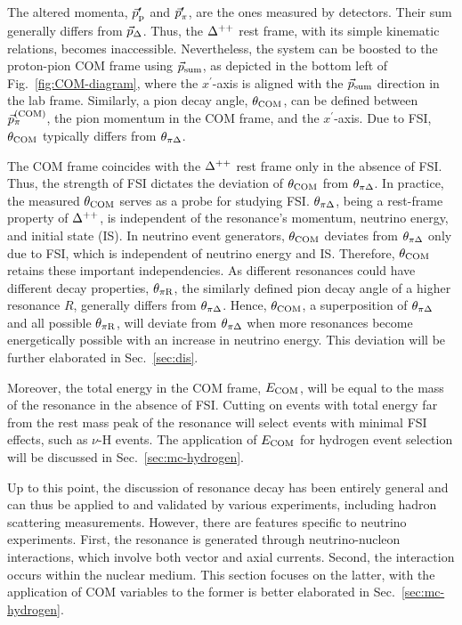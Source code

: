 The altered momenta, $\vec{p}_\textrm{p}^{\prime}$ and $\vec{p}_{\pi}^{\prime}$, are the ones measured by detectors. 
Their sum generally differs from $\vec{p}_{\Delta}$.
Thus, the $\Delta^{++}$ rest frame, with its simple kinematic relations, becomes inaccessible.
Nevertheless, the system can be boosted to the proton-pion COM frame using $\vec{p}_{\textrm{sum}}$, as depicted in the bottom left of Fig.~\ref{fig:COM-diagram}, where the $x^{\prime}$-axis is aligned with the $\vec{p}_{\textrm{sum}}$ direction in the lab frame.
Similarly, a pion decay angle, $\theta_{\textrm{COM}}$, can be defined between $\vec{p}_{\pi}^{(\textrm{COM})}$, the pion momentum in the COM frame, and the $x^{\prime}$-axis.
Due to FSI, $\theta_{\textrm{COM}}$ typically differs from $\theta_{\pi\Delta}$. 

The COM frame coincides with the $\Delta^{++}$ rest frame only in the absence of FSI.
Thus, the strength of FSI dictates the deviation of $\theta_{\textrm{COM}}$ from $\theta_{\pi\Delta}$. 
In practice, the measured $\theta_{\textrm{COM}}$ serves as a probe for studying FSI. 
$\theta_{\pi\Delta}$, being a rest-frame property of $\Delta^{++}$, is independent of the resonance's momentum, neutrino energy, and initial state (IS).
In neutrino event generators, $\theta_{\textrm{COM}}$ deviates from $\theta_{\pi\Delta}$ only due to FSI, which is independent of neutrino energy and IS.
Therefore, $\theta_{\textrm{COM}}$ retains these important independencies.
As different resonances could have different decay properties, $\theta_{\pi\textrm{R}}$, the similarly defined pion decay angle of a higher resonance $R$, generally differs from $\theta_{\pi\Delta}$. 
Hence, $\theta_{\textrm{COM}}$, a superposition of $\theta_{\pi\Delta}$ and all possible $\theta_{\pi\textrm{R}}$, will deviate from $\theta_{\pi\Delta}$ when more resonances become energetically possible with an increase in neutrino energy. 
This deviation will be further elaborated in Sec.~\ref{sec:dis}.

Moreover, the total energy in the COM frame, $E_{\textrm{COM}}$, will be equal to the mass of the resonance in the absence of FSI.
Cutting on events with total energy far from the rest mass peak of the resonance will select events with minimal FSI effects, such as $\nu$-H events. 
The application of $E_{\textrm{COM}}$ for hydrogen event selection will be discussed in Sec.~\ref{sec:mc-hydrogen}.

Up to this point, the discussion of resonance decay has been entirely general and can thus be applied to and validated by various experiments, including hadron scattering measurements. 
However, there are features specific to neutrino experiments. 
First, the resonance is generated through neutrino-nucleon interactions, which involve both vector and axial currents. 
Second, the interaction occurs within the nuclear medium. 
This section focuses on the latter, with the application of COM variables to the former is better elaborated in Sec.~\ref{sec:mc-hydrogen}.

